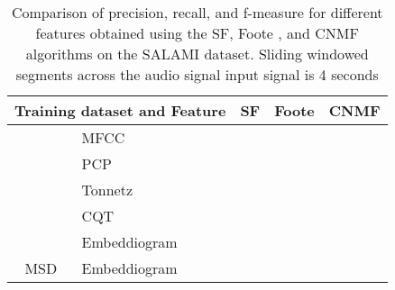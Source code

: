 \begin{table}
  \centering
  \begin{adjustbox}{width=\textwidth}
  \begin{threeparttable}
    \begin{tabular}{c|l|c|c|c} 
\toprule
     \multicolumn{2}{c|}{\textbf{Training dataset} and \textbf{Feature}}  & \multicolumn{1}{c}{\textbf{SF}} & \multicolumn{1}{c}{\textbf{Foote}} & \multicolumn{1}{c}{\textbf{CNMF}} 
     \\ \midrule 
    \multirow{5}{*}{}&   
         \multirow{1}{*}{MFCC } & \usebox{\mfccSF} & \usebox{\mfccFoote} & \usebox{\mfccCNMF} \\\cline{2-5}
        & \multirow{1}{*}{PCP} & \usebox{\pcpSF} & \usebox{\pcpFoote} & \usebox{\pcpCNMF} \\\cline{2-5}
        & \multirow{1}{*}{Tonnetz} & \usebox{\tonnetzSF} & \usebox{\tonnetzFoote} & \usebox{\tonnetzCNMF} \\\cline{2-5} 
        & \multirow{1}{*}{CQT} & \usebox{\cqtSF} & \usebox{\cqtFoote} & \usebox{\cqtCNMF} \\\cline{1-5} 
    \multirow{1}{*}{GTZAN \cite{GTZAN}}& 
        \multirow{1}{*}{Embeddiogram} & \usebox{\embeddioaSF} & \usebox{\embeddioaFoote} & \usebox{\embeddioaCNMF} \\\cline{1-5} 
    \multirow{1}{*}{MSD \cite{MSD}}& 
        \multirow{1}{*}{Embeddiogram} & \usebox{\embeddiobSF} & \usebox{\embeddiobFoote} & \usebox{\embeddiobCNMF} \\\bottomrule
    \end{tabular}
    \caption[Metric comparison for different audio features and different segmentation algorithms]{Comparison of precision, recall, and f-measure for different features obtained using the SF\cite{sf}, Foote \cite{Foote2000AutomaticNovelty}, and CNMF \cite{NietoCONVEXIDENTIFICATION} algorithms on the SALAMI dataset. Sliding windowed segments across the audio signal input signal is 4 seconds}\label{ta:results}
  \end{threeparttable}
  \end{adjustbox}
\end{table}




